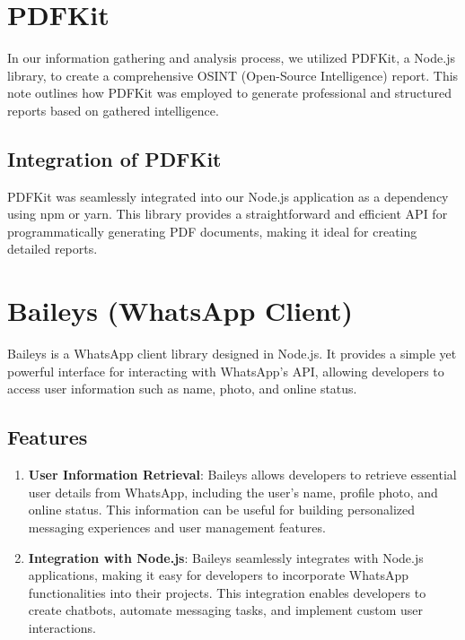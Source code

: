 \section{PDFKit}

In our information gathering and analysis process, we utilized PDFKit, a Node.js library, to create a comprehensive OSINT (Open-Source Intelligence) report. This note outlines how PDFKit was employed to generate professional and structured reports based on gathered intelligence.

  
\subsection{Integration of PDFKit}

PDFKit was seamlessly integrated into our Node.js application as a dependency using npm or yarn. This library provides a straightforward and efficient API for programmatically generating PDF documents, making it ideal for creating detailed reports.

\section{Baileys (WhatsApp Client)}

Baileys is a  WhatsApp client library designed in Node.js. It provides a simple yet powerful interface for interacting with WhatsApp's API, allowing developers to access user information such as name, photo, and online status.

\subsection{Features}

\begin{enumerate}
  \item \textbf{User Information Retrieval}: Baileys allows developers to retrieve essential user details from WhatsApp, including the user's name, profile photo, and online status. This information can be useful for building personalized messaging experiences and user management features.
  
  \item \textbf{Integration with Node.js}: Baileys seamlessly integrates with Node.js applications, making it easy for developers to incorporate WhatsApp functionalities into their projects. This integration enables developers to create chatbots, automate messaging tasks, and implement custom user interactions.

\end{enumerate}




